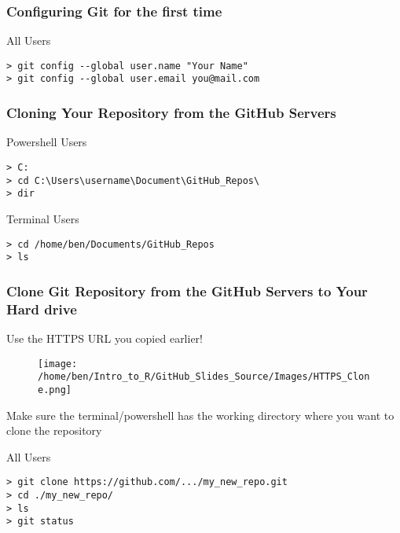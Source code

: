 \documentclass[xcolor=dvipsnames]{beamer}
\begin{document}
\begin{frame}[fragile]
\frametitle{Configuring Git for the first time}
\begin{block}{All Users}
\begin{lstlisting}
> git config --global user.name "Your Name"
> git config --global user.email you@mail.com
\end{lstlisting}
\end{block}
\end{frame}


\begin{frame}[fragile]
\frametitle{Cloning Your Repository from the GitHub Servers}

\begin{block}{Powershell Users}
\begin{lstlisting}
> C:
> cd C:\Users\username\Document\GitHub_Repos\
> dir 
\end{lstlisting}
\end{block}

\begin{block}{Terminal Users}
\begin{lstlisting}
> cd /home/ben/Documents/GitHub_Repos
> ls 
\end{lstlisting}
\end{block}
\end{frame}

\begin{frame}[fragile]
\frametitle{Clone Git Repository from the GitHub Servers to Your Hard drive}
Use the HTTPS URL you copied earlier!\\
\begin{center}
\begin{figure}
\texttt{[image: /home/ben/Intro\_to\_R/GitHub\_Slides\_Source/Images/HTTPS\_Clone.png]}
\end{figure}
\end{center}
Make sure the terminal/powershell has the working directory where you want to clone the repository
\begin{block}{All Users}
\begin{lstlisting}
> git clone https://github.com/.../my_new_repo.git
> cd ./my_new_repo/
> ls
> git status
\end{lstlisting}
\end{block}
\end{frame}
\end{document}
